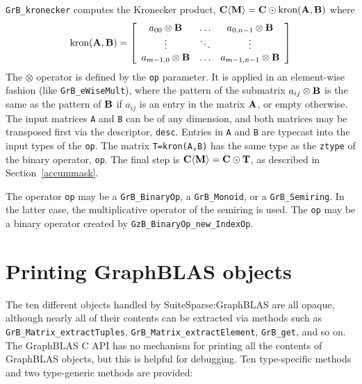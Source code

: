 \documentclass[12pt]{article}
\begin{document}
\verb'GrB_kronecker' computes the Kronecker product,
${\bf C \langle M \rangle = C \odot \mbox{kron}(A,B)}$ where
\[
\mbox{kron}{\bf (A,B)} =
\left[
    \begin{array}{ccc}
    a_{00} \otimes {\bf B} & \ldots & a_{0,n-1} \otimes {\bf B} \\
    \vdots & \ddots & \vdots \\
    a_{m-1,0} \otimes {\bf B} & \ldots & a_{m-1,n-1} \otimes {\bf B} \\
    \end{array}
\right]
\]
The $\otimes$ operator is defined by the \verb'op' parameter.  It is applied in
an element-wise fashion (like \verb'GrB_eWiseMult'), where the pattern of the
submatrix $a_{ij} \otimes {\bf B}$ is the same as the pattern of ${\bf B}$ if
$a_{ij}$ is an entry in the matrix ${\bf A}$, or empty otherwise.  The input
matrices \verb'A' and \verb'B' can be of any dimension, and both matrices may
be transposed first via the descriptor, \verb'desc'.  Entries in \verb'A' and
\verb'B' are typecast into the input types of the \verb'op'.  The matrix
\verb'T=kron(A,B)' has the same type as the \verb'ztype' of the binary
operator, \verb'op'.  The final step is ${\bf C \langle M \rangle  = C \odot
T}$, as described in Section~\ref{accummask}.

The operator \verb'op' may be a \verb'GrB_BinaryOp', a \verb'GrB_Monoid', or a
\verb'GrB_Semiring'.  In the latter case, the multiplicative operator of
the semiring is used.
%
The \verb'op' may be a binary operator
created by \verb'GzB_BinaryOp_new_IndexOp'.

\newpage
\section{Printing GraphBLAS objects} %
\label{fprint}

The ten different objects handled by SuiteSparse:GraphBLAS are all opaque,
although nearly all of their contents can be extracted via methods such as
\verb'GrB_Matrix_extractTuples', \verb'GrB_Matrix_extractElement',
\verb'GrB_get', and so on.  The GraphBLAS C API has no mechanism for
printing all the contents of GraphBLAS objects, but this is helpful for
debugging.  Ten type-specific methods and two type-generic methods are
provided:
\end{document}

